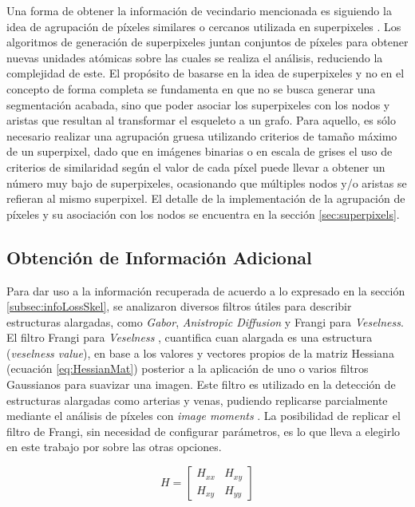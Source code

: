 Una forma de obtener la informaci\'on de vecindario mencionada es siguiendo la idea de agrupaci\'on de p\'ixeles similares o cercanos utilizada en superpixeles \cite{achanta2012slic}. Los algoritmos de generaci\'on de superpixeles juntan conjuntos de p\'ixeles para obtener nuevas unidades at\'omicas sobre las cuales se realiza el an\'alisis, reduciendo la complejidad de este. El prop\'osito de basarse en la idea de superpixeles y no en el concepto de forma completa se fundamenta en que no se busca generar una segmentaci\'on acabada, sino que poder asociar los superpixeles con los nodos y aristas que resultan al transformar el esqueleto a un grafo. Para aquello, es s\'olo necesario realizar una agrupaci\'on gruesa utilizando criterios de tama\~no m\'aximo de un superpixel, dado que en im\'agenes binarias o en escala de grises el uso de criterios de similaridad seg\'un el valor de cada p\'ixel puede llevar a obtener un n\'umero muy bajo de superpixeles, ocasionando que m\'ultiples nodos y/o aristas se refieran al mismo superpixel. El detalle de la implementaci\'on de la agrupaci\'on de p\'ixeles y su asociaci\'on con los nodos se encuentra en la secci\'on \ref{sec:superpixels}.


\subsection{Obtenci\'on de Informaci\'on Adicional}

Para dar uso a la informaci\'on recuperada de acuerdo a lo expresado en la secci\'on \ref{subsec:infoLossSkel}, se analizaron diversos filtros \'utiles para describir estructuras alargadas, como {\it Gabor}, {\it Anistropic Diffusion} y Frangi para {\it Veselness}. El filtro Frangi para {\it Veselness} \cite{frangi1998multiscale}\cite{fu2018frangi}, cuantifica cuan alargada es una estructura ({\it veselness value}), en base a los valores y vectores propios de la matriz Hessiana (ecuaci\'on \ref{eq:HessianMat}) posterior a la aplicaci\'on de uno o varios filtros Gaussianos para suavizar una imagen. Este filtro es utilizado en la detecci\'on de estructuras alargadas como arterias y venas, pudiendo replicarse parcialmente mediante el an\'alisis de p\'ixeles con {\it image moments} \cite{flusser2009moments}. La posibilidad de replicar el filtro de Frangi, sin necesidad de configurar par\'ametros, es lo que lleva a elegirlo en este trabajo por sobre las otras opciones.

\begin{equation}
    \label{eq:HessianMat}
    H = \begin{bmatrix}
        H_{xx} & H_{xy} \\
        H_{xy} & H_{yy} 
        \end{bmatrix}
\end{equation}

